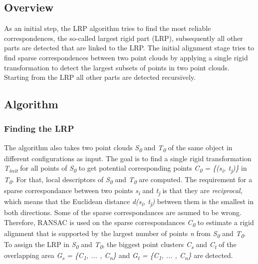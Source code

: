 \subsection{Overview}
As an initial step, the LRP algorithm tries to find the most reliable correspondences, the so-called largest rigid part (LRP), subsequently all other parts are detected that are linked to the LRP. The initial alignment stage tries to find sparse correspondences between two point clouds by applying a single rigid transformation to detect the largest subsets of points in two point clouds. Starting from the LRP all other parts are detected recursively.

\subsection{Algorithm} 

\subsubsection{Finding the LRP}

The algorithm also takes two point clouds \textit{S\textsubscript{0}} and \textit{T\textsubscript{0}} of the same object in different configurations as input.
The goal is to find a single rigid transformation \textit{T\textsubscript{init}} for all points of \textit{S\textsubscript{0}} to get potential corresponding points \textit{C\textsubscript{0} = \{(s\textsubscript{i}, t\textsubscript{j})\}} in \textit{T\textsubscript{0}}. For that, local descriptors of \textit{S\textsubscript{0}} and \textit{T\textsubscript{0}} are computed. The requirement for a sparse correspondance between two points \textit{s\textsubscript{i}} and \textit{t\textsubscript{j}}  is that they are \textit{reciprocal}, which means that the Euclidean distance \textit{d(s\textsubscript{i}, t\textsubscript{j})} between them is the smallest in both directions. Some of the sparse correspondances are asumed to be wrong. Therefore, RANSAC is used on the sparse correspondances \textit{C\textsubscript{0}} to estimate a rigid alignment that is supported by the largest number of points \textit{n} from \textit{S\textsubscript{0}} and \textit{T\textsubscript{0}}. To assign the LRP in \textit{S\textsubscript{0}} and \textit{T\textsubscript{0}}, the biggest point clusters \textit{C\textsubscript{s}} and \textit{C\textsubscript{t}} of the overlapping area \textit{G\textsubscript{s} = \{C\textsubscript{1}, ... , C\textsubscript{n}\} } and \textit{G\textsubscript{t} = \{C\textsubscript{1}, ... , C\textsubscript{n}\} } are detected. 


